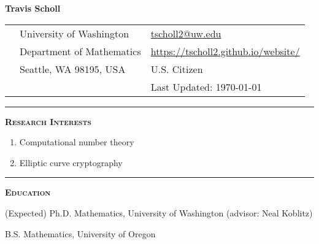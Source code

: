 \documentclass[12pt]{article}
\newcommand{\sectionheading}[1]
{
\bigskip %
\noindent
\hspace{-6.5mm}\textcolor{Gray}{\rule[.75mm]{21.5mm}{1mm}} %
\hspace{.2mm}	%
{\large{\textbf{\textsc{#1}}}} %
}
\newenvironment{date_section}
	{
	\vspace{-1ex}
	\leftmargini = 15ex
		\begin{itemize}[
			labelsep = *,
			labelwidth = 9ex,
			labelindent = 0ex,
			itemindent = !,
			font=\normalfont,
			align=parleft
		]{}
		\itemsep=-1.5mm
	}
	{\end{itemize}\vspace{-2ex}}
\newcommand{\yearmo}[2]{
	\item[
		{\makebox[1ex][r]{#1}}
		\hspace{1ex}
		{\makebox[1ex][l]{#2} }
		] }
\newcommand{\yearrange}[2]{
	\item[
		{\makebox[1ex][r]{#1}}
		--
		{\makebox[1ex][l]{#2} }
		] }
\begin{document}

	\thispagestyle{empty}

	\centerline{{\LARGE \textbf{Travis Scholl}}}

	\vspace{3mm}

	\begin{center}
		\begin{tabular}[c]{lll} %
			\phantom{aaaaaaaaa} %
			& University of Washington
				& \url{tscholl2@uw.edu} \\
 			& Department of Mathematics
				& \url{https://tscholl2.github.io/website/}\\
 			& Seattle, WA 98195, USA
	 			& U.S. Citizen \\
			&
				& Last Updated: \today
		\end{tabular}
	\end{center}

	\sectionheading{Research Interests}%
	
	\vspace{1ex}
	
	\begin{enumerate}[label=$\bullet$, itemsep=-1mm, leftmargin=24mm]
		\item Computational number theory
		\item Elliptic curve cryptography
	\end{enumerate}

	\sectionheading{Education}%

		\begin{date_section}

			\yearmo{}{2018} (Expected) Ph.D. Mathematics, University of Washington (advisor: Neal Koblitz)

			\yearmo{}{2013} %
			B.S. Mathematics, University of Oregon





		\end{date_section}
\end{document}
